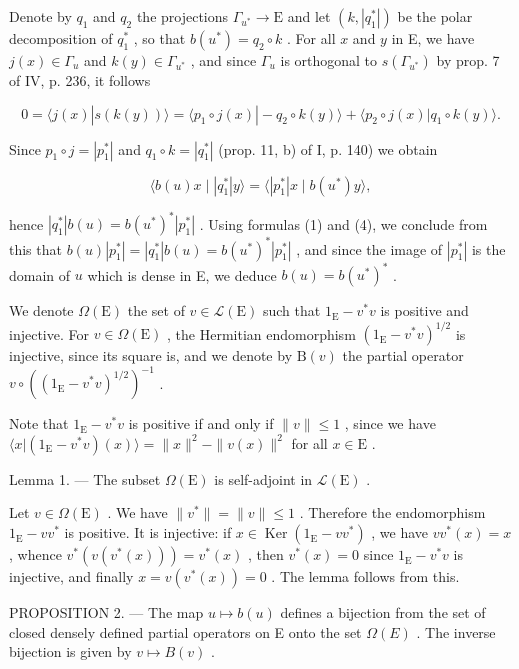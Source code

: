 Denote by \(q_{1}\) and \(q_{2}\) the projections \(\Gamma_{u^{*}}\to\mathrm{E}\) and let \((k,|q_{1}^{*}|)\) be the polar decomposition of \(q_{1}^{*}\) , so that \(b(u^{*})=q_{2}\circ k\) . For all \(x\) and \(y\) in E, we have \(j(x)\in\Gamma_{u}\) and \(k(y)\in\Gamma_{u^{*}}\) , and since \(\Gamma_{u}\) is orthogonal to \(s(\Gamma_{u^{*}})\) by prop. 7 of IV, p. 236, it follows

\[
0 = \langle j (x) | s (k (y)) \rangle = \langle p _ {1} \circ j (x) | - q _ {2} \circ k (y) \rangle + \langle p _ {2} \circ j (x) | q _ {1} \circ k (y) \rangle .
\]

Since \(p_1 \circ j = |p_1^*|\) and \(q_1 \circ k = |q_1^*|\) (prop. 11, b) of I, p. 140) we obtain

\[
\langle b (u) x \mid | q _ {1} ^ {*} | y \rangle = \langle | p _ {1} ^ {*} | x \mid b (u ^ {*}) y \rangle ,
\]

hence \(|q_1^*|b(u) = b(u^*)^* |p_1^*|\) . Using formulas (1) and (4), we conclude from this that \(b(u)|p_1^*| = |q_1^*|b(u) = b(u^*)^* |p_1^*|\) , and since the image of \(|p_1^*|\) is the domain of \(u\) which is dense in E, we deduce \(b(u) = b(u^*)^*\) .

We denote \(\Omega(\mathrm{E})\) the set of \(v \in \mathcal{L}(\mathrm{E})\) such that \(1_{\mathrm{E}} - v^{*}v\) is positive and injective. For \(v \in \Omega(\mathrm{E})\) , the Hermitian endomorphism \((1_{\mathrm{E}} - v^{*}v)^{1/2}\) is injective, since its square is, and we denote by \(\mathrm{B}(v)\) the partial operator \(v \circ ((1_{\mathrm{E}} - v^{*}v)^{1/2})^{-1}\) .

Note that \(1_{\mathrm{E}} - v^{*}v\) is positive if and only if \(\| v\| \leqslant 1\) , since we have \(\langle x|(1_{\mathrm{E}} - v^{*}v)(x)\rangle = \| x\| ^2 -\| v(x)\| ^2\) for all \(x\in \mathrm{E}\) .

Lemma 1. --- The subset \(\Omega(\mathrm{E})\) is self-adjoint in \(\mathcal{L}(\mathrm{E})\) .

Let \(v \in \Omega(\mathrm{E})\) . We have \(\|v^{*}\| = \|v\| \leqslant 1\) . Therefore the endomorphism \(1_{\mathrm{E}} - vv^{*}\) is positive. It is injective: if \(x \in \operatorname{Ker}(1_{\mathrm{E}} - vv^{*})\) , we have \(vv^{*}(x) = x\) , whence \(v^{*}(v(v^{*}(x))) = v^{*}(x)\) , then \(v^{*}(x) = 0\) since \(1_{\mathrm{E}} - v^{*}v\) is injective, and finally \(x = v(v^{*}(x)) = 0\) . The lemma follows from this.

PROPOSITION 2. — The map \(u \mapsto b(u)\) defines a bijection from the set of closed densely defined partial operators on E onto the set \(\Omega(E)\) . The inverse bijection is given by \(v \mapsto B(v)\) .

